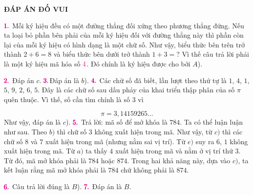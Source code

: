 \newpage
\begin{center}
	\textbf{\color{toancuabi}ĐÁP ÁN ĐỐ VUI}
\end{center}

$\color{toancuabi}\pmb{1.}$
Mỗi ký hiệu đều có một đường thẳng đối xứng theo phương thẳng đứng. Nếu ta loại bỏ phần bên phải của mỗi ký hiệu đối với đường thẳng này thì phần còn lại của mỗi ký hiệu có hình dạng là một chữ số. Như vậy, biểu thức bên trên trở thành $2+6=8$ và biểu thức bên dưới trở thành $1+3=?$ Vì thế câu trả lời phải là một ký hiệu mã hóa số $\color{toancuabi}4$. Đó chính là ký hiệu được cho bởi $A$).
\vskip 0.1cm

$\color{toancuabi}\pmb{2.}$ Đáp án $c$.
\vskip 0.1cm
$\color{toancuabi}\pmb{3.}$Đáp án là $b$).
\vskip 0.1cm
$\color{toancuabi}\pmb{4.}$ Các chữ số đã biết, lần lượt theo thứ tự là $1$, $4$, $1$, $5$, $9$, $2$, $6$, $5$. Đây là các chữ số sau dấu phảy của khai triển thập phân của số $\pi$ quên thuộc. Vì thế, số cần tìm chính là số $3$ vì

$$\pi = 3, 14159265\ldots$$
Như vậy, đáp án là $c$).
\vskip 0.1cm
$\color{toancuabi}\pmb{5.}$ Trả lời: mã số để mở khóa là $784$.
\vskip 0.1cm
Ta có thể luận luận như sau. Theo $b)$ thì chữ số  $3$  không xuất hiện trong mã. Như vậy, từ $c)$ thì các chữ số  $8$ và $7$ xuất hiện trong mã (nhưng nằm sai vị trí). Từ $e)$ suy ra $6$, $1$ không xuất hiện trong mã. Từ $a)$  ta thấy $4$ xuất hiện trong mã và nằm ở vị trí thứ $3$. Từ đó, mã mở khóa phải là $784$ hoặc $874$. Trong hai khả năng này, dựa vào $c)$, ta kết luận rằng mã mở khóa phải là $784$ chứ không phải là $874$.
\vskip 0.1cm

$\color{toancuabi}\pmb{6.}$ Câu trả lời đúng là $B$).
\vskip 0.1cm
$\color{toancuabi}\pmb{7.}$ Đáp án là $B$.
